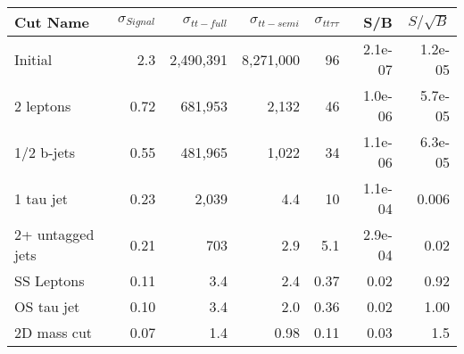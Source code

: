 \begin{tabular}{lrrrrrr}
\toprule
         Cut Name &  $\sigma_{Signal}$ &  $\sigma_{tt-full}$ &  $\sigma_{tt-semi}$ &  $\sigma_{tt\tau\tau}$ &     S/B &  $S/\sqrt{B}$ \\
\midrule
          Initial &                2.3 &           2,490,391 &           8,271,000 &                     96 & 2.1e-07 &       1.2e-05 \\
        2 leptons &               0.72 &             681,953 &               2,132 &                     46 & 1.0e-06 &       5.7e-05 \\
       1/2 b-jets &               0.55 &             481,965 &               1,022 &                     34 & 1.1e-06 &       6.3e-05 \\
        1 tau jet &               0.23 &               2,039 &                 4.4 &                     10 & 1.1e-04 &         0.006 \\
 2+ untagged jets &               0.21 &                 703 &                 2.9 &                    5.1 & 2.9e-04 &          0.02 \\
       SS Leptons &               0.11 &                 3.4 &                 2.4 &                   0.37 &    0.02 &          0.92 \\
       OS tau jet &               0.10 &                 3.4 &                 2.0 &                   0.36 &    0.02 &          1.00 \\
      2D mass cut &               0.07 &                 1.4 &                0.98 &                   0.11 &    0.03 &           1.5 \\
\bottomrule
\end{tabular}
